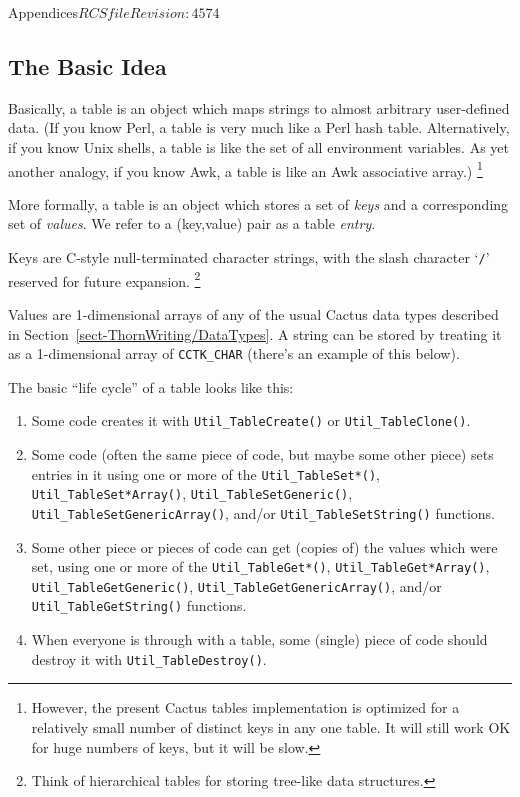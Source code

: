 \begin{cactuspart}{Appendices}{$RCSfile$}{$Revision: 4574 $}

\subsection{The Basic Idea}

Basically, a table is an object which maps strings to almost arbitrary
user-defined data.  (If you know Perl, a table is very much like a
Perl hash table.  Alternatively, if you know Unix shells, a table is
like the set of all environment variables.  As yet another analogy,
if you know Awk, a table is like an Awk associative array.)%
\footnote{%
	 However, the present Cactus tables implementation
	 is optimized for a relatively small number of
	 distinct keys in any one table.  It will still
	 work OK for huge numbers of keys, but it will be
	 slow.
	 }%

More formally, a table is an object which stores a set of \textit{keys}
and a corresponding set of \textit{values}.  We refer to a (key,value)
pair as a table \textit{entry}.

Keys are C-style null-terminated character strings, with the slash
character `{\tt /}' reserved for future expansion.%
\footnote{%
	 Think of hierarchical tables for storing
	 tree-like data structures.%
	 }%

Values are 1-dimensional arrays of any of the usual Cactus data types
described in Section~\ref{sect-ThornWriting/DataTypes}.
A string can be stored by treating it as a 1-dimensional array of
\verb|CCTK_CHAR| (there's an example of this below).

The basic ``life cycle'' of a table looks like this:
\begin{enumerate}
\item	Some code creates it with \verb|Util_TableCreate()|
	or \verb|Util_TableClone()|.
\item	Some code (often the same piece of code, but maybe some
	other piece) sets entries in it using one or more of
	the \verb|Util_TableSet*()|, \verb|Util_TableSet*Array()|,
	\verb|Util_TableSetGeneric()|, \verb|Util_TableSetGenericArray()|,
	and/or \verb|Util_TableSetString()| functions.
\item	Some other piece or pieces of code can get (copies of)
	the values which were set, using one or more of the
	\verb|Util_TableGet*()|, \verb|Util_TableGet*Array()|,
	\verb|Util_TableGetGeneric()|, \verb|Util_TableGetGenericArray()|,
	and/or \verb|Util_TableGetString()| functions.
\item	When everyone is through with a table, some (single)
	piece of code should destroy it with \verb|Util_TableDestroy()|.
\end{enumerate}


\end{cactuspart}
